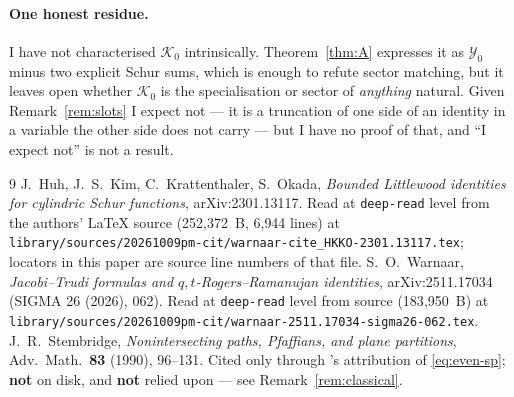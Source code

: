 \documentclass[11pt]{article}
\theoremstyle{plain}
\theoremstyle{definition}
\begin{document}
\paragraph{One honest residue.}  I have not characterised $\mathcal K_0$ intrinsically.
Theorem~\ref{thm:A} expresses it as $\mathcal Y_0$ minus two explicit Schur sums, which is
enough to refute sector matching, but it leaves open whether $\mathcal K_0$ is the
specialisation or sector of \emph{anything} natural.  Given Remark~\ref{rem:slots} I expect
not --- it is a truncation of one side of an identity in a variable the other side does not
carry --- but I have no proof of that, and ``I expect not'' is not a result.

\begin{thebibliography}{9}
 J.~Huh, J.~S.~Kim, C.~Krattenthaler, S.~Okada,
  \emph{Bounded Littlewood identities for cylindric Schur functions},
  arXiv:2301.13117.  Read at \texttt{deep-read} level from the authors' \LaTeX{} source
  (252{,}372~B, 6{,}944 lines) at
  \texttt{library/sources/20261009pm-cit/warnaar-cite\_HKKO-2301.13117.tex}; locators in
  this paper are source line numbers of that file.
 S.~O.~Warnaar, \emph{Jacobi--Trudi formulas and $q,t$-Rogers--Ramanujan
  identities}, arXiv:2511.17034 (SIGMA 26 (2026), 062).  Read at \texttt{deep-read} level
  from source (183{,}950~B) at
  \texttt{library/sources/20261009pm-cit/warnaar-2511.17034-sigma26-062.tex}.
 J.~R.~Stembridge, \emph{Nonintersecting paths, Pfaffians, and plane
  partitions}, Adv.\ Math.\ \textbf{83} (1990), 96--131.  Cited only through
  \cite{HKKO}'s attribution of \eqref{eq:even-sp}; \textbf{not} on disk, and
  \textbf{not} relied upon --- see Remark~\ref{rem:classical}.
\end{thebibliography}
\end{document}
